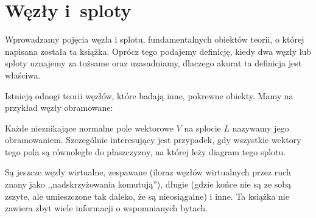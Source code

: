 
\section{Węzły i~sploty}
Wprowadzamy pojęcia węzła i splotu, fundamentalnych obiektów teorii, o której napisana została ta książka.
Oprócz tego podajemy definicję, kiedy dwa węzły lub sploty uznajemy za tożsame oraz uzasadniamy, dlaczego akurat ta definicja jest właściwa.

Istnieją odnogi teorii węzłów, które badają inne, pokrewne obiekty.
Mamy na przykład węzły obramowane:

\begin{definition}[obramowanie]
%
%
    Każde nieznikające normalne pole wektorowe $V$ na splocie $L$ nazywamy jego obramowaniem.
    Szczególnie interesujący jest przypadek, gdy wszystkie wektory tego pola są równoległe do płaszczyzny, na której leży diagram tego splotu.
\end{definition}

Są jeszcze węzły wirtualne, zespawane (iloraz węzłów wirtualnych przez ruch znany jako ,,nadskrzyżowania komutują''), długie (gdzie końce nie są ze sobą zszyte, ale umieszczone tak daleko, że są nieosiągalne) i inne.
%
%
%
Ta książka nie zawiera zbyt wiele informacji o wspomnianych bytach.







